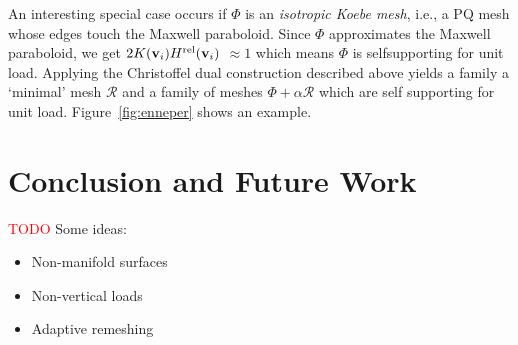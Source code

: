 \documentclass[annual]{acmsiggraph}
\def\rel{{\mathord{\text{\rm rel}}}}
\def\RR{{\mathcal R}}
\newcommand{\todo}[1]{\textcolor{red}{#1}}
\begin{document}

An  interesting special case occurs if $\Phi$ is an
\emph{isotropic Koebe mesh}, i.e., a PQ mesh whose edges
touch the Maxwell paraboloid. Since $\Phi$ approximates the Maxwell
paraboloid, we get $2K(\vw_i)H^{\rel}(\vw_i)$ $ \approx 1$ which means
$\Phi$ is self\dash supporting for unit load. Applying the Christoffel
dual construction described above yields a family a `minimal' mesh
$\RR$ and a family of meshes $\Phi+\alpha\RR$ which are self\dash 
supporting for unit load. Figure~\ref{fig:enneper} shows an example.

\section{Conclusion and Future Work}

\todo{TODO}
Some ideas:
\begin{itemize}
\item{Non-manifold surfaces}
\item{Non-vertical loads}
\item{Adaptive remeshing}
\end{itemize}






\end{document}
